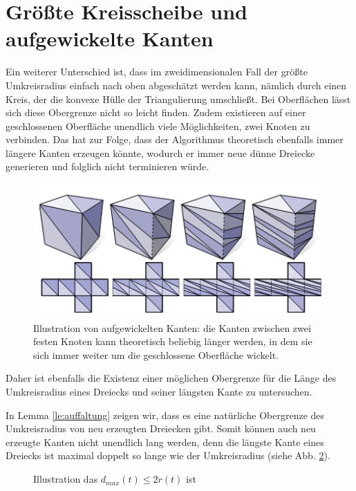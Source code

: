 \section*{Größte Kreisscheibe und aufgewickelte Kanten}
Ein weiterer Unterschied ist, dass im zweidimensionalen Fall der größte Umkreisradius  einfach nach oben abgeschätzt werden kann, nämlich durch einen Kreis, der die konvexe Hülle der Triangulierung umschließt. Bei Oberflächen lässt sich diese Obergrenze nicht so leicht finden. Zudem existieren auf einer geschlossenen Oberfläche unendlich viele Möglichkeiten, zwei Knoten zu verbinden. Das hat zur Folge, dass der Algorithmus theoretisch ebenfalls immer längere Kanten erzeugen könnte, wodurch er immer neue dünne Dreiecke generieren und folglich nicht terminieren würde.\\
 \begin{figure}[H]
    \centering
    \includegraphics[width=5in]{images/aufgewickeltes_dreieck.png}
    \caption{ Illustration von aufgewickelten Kanten: die Kanten zwischen zwei festen Knoten kann theoretisch beliebig länger werden, in dem sie sich immer weiter um die geschlossene Oberfläche wickelt.\cite{Sharp:2019:NIT} }
    \label{fig:aufgewickeltung}
\end{figure}


Daher ist ebenfalls die Existenz einer möglichen Obergrenze für die Länge des Umkreisradius eines Dreiecks und seiner längsten Kante zu untersuchen. 

In Lemma \ref{le:auffaltung} zeigen wir, dass es eine natürliche Obergrenze des Umkreisradius von neu erzeugten Dreiecken gibt. Somit können auch neu erzeugte Kanten nicht unendlich lang werden, denn die längste Kante eines Dreiecks ist maximal doppelt so lange wie der Umkreisradius (siehe Abb. \ref{fig:langsteKante}).
 \begin{figure}[H]
    \centering
    
    \caption{ Illustration das $d_{max}(t) \leq 2r(t)$ ist}%
    \label{fig:langsteKante}
\end{figure}
 


